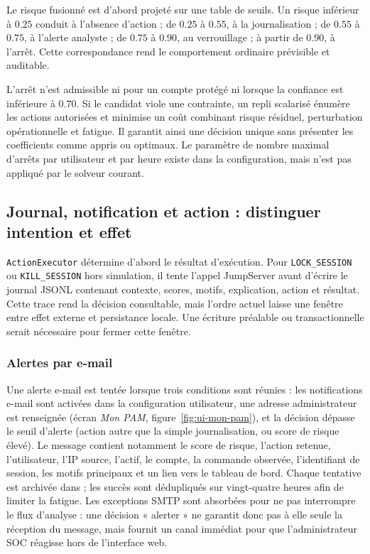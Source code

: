 \documentclass[11pt,a4paper,oneside]{report}
\theoremstyle{definition}
\theoremstyle{plain}
\begin{document}
Le risque fusionné est d'abord projeté sur une table de seuils. Un risque
inférieur à \(0.25\) conduit à l'absence d'action ; de \(0.25\) à \(0.55\), à
la journalisation ; de \(0.55\) à \(0.75\), à l'alerte analyste ; de \(0.75\)
à \(0.90\), au verrouillage ; à partir de \(0.90\), à l'arrêt. Cette
correspondance rend le comportement ordinaire prévisible et auditable.

L'arrêt n'est admissible ni pour un compte protégé ni lorsque la confiance est
inférieure à \(0.70\). Si le candidat viole une contrainte, un repli scalarisé
énumère les actions autorisées et minimise un coût combinant risque résiduel,
perturbation opérationnelle et fatigue. Il garantit ainsi une décision unique
sans présenter les coefficients comme appris ou optimaux. Le paramètre de
nombre maximal d'arrêts par utilisateur et par heure existe dans la
configuration, mais n'est pas appliqué par le solveur courant.

\subsection{Journal, notification et action : distinguer intention et effet}

\texttt{ActionExecutor} détermine d'abord le résultat d'exécution. Pour
\texttt{LOCK\_SESSION} ou \texttt{KILL\_SESSION} hors simulation, il tente
l'appel JumpServer avant d'écrire le journal JSONL contenant contexte, scores,
motifs, explication, action et résultat. Cette trace rend la décision
consultable, mais l'ordre actuel laisse une fenêtre entre effet externe et
persistance locale. Une écriture préalable ou transactionnelle serait
nécessaire pour fermer cette fenêtre.

\subsubsection{Alertes par e-mail}

Une alerte e-mail est tentée lorsque trois conditions sont réunies : les
notifications e-mail sont activées dans la configuration utilisateur, une
adresse administrateur est renseignée (écran \emph{Mon PAM},
figure~\ref{fig:ui-mon-pam}), et la décision dépasse le seuil d'alerte (action
autre que la simple journalisation, ou score de risque élevé). Le message
contient notamment le score de risque, l'action retenue, l'utilisateur, l'IP
source, l'actif, le compte, la commande observée, l'identifiant de session, les
motifs principaux et un lien vers le tableau de bord. Chaque tentative est
archivée dans  ; les succès sont dédupliqués sur
vingt-quatre heures afin de limiter la fatigue. Les exceptions SMTP sont
absorbées pour ne pas interrompre le flux d'analyse : une décision « alerter »
ne garantit donc pas à elle seule la réception du message, mais fournit un
canal immédiat pour que l'administrateur SOC réagisse hors de l'interface web.
\end{document}
